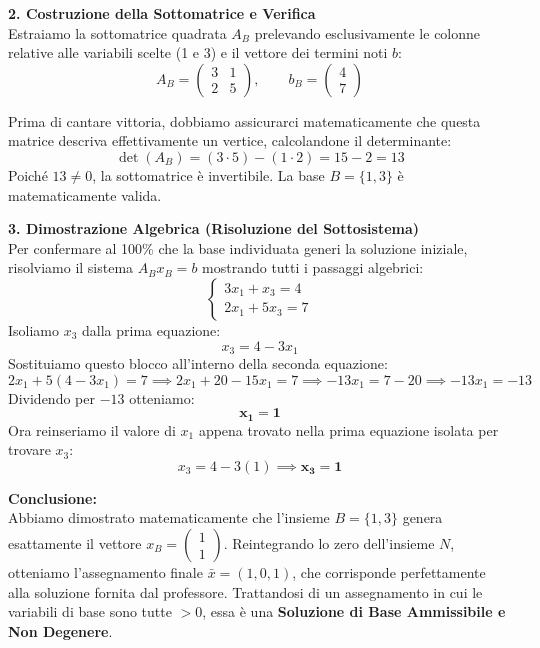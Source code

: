 \documentclass[12pt, a4paper]{article}
\begin{document}
	\vspace{0.4cm}
	\textbf{2. Costruzione della Sottomatrice e Verifica}\\
	Estraiamo la sottomatrice quadrata $A_B$ prelevando esclusivamente le colonne relative alle variabili scelte (1 e 3) e il vettore dei termini noti $b$:
	\[
	A_B = \begin{pmatrix} 3 & 1 \\ 2 & 5 \end{pmatrix}, \qquad b_B = \begin{pmatrix} 4 \\ 7 \end{pmatrix}
	\]
	
	Prima di cantare vittoria, dobbiamo assicurarci matematicamente che questa matrice descriva effettivamente un vertice, calcolandone il determinante:
	\[
	\det(A_B) = (3 \cdot 5) - (1 \cdot 2) = 15 - 2 = 13
	\]
	Poiché $13 \neq 0$, la sottomatrice è invertibile. La base $B = \{1, 3\}$ è matematicamente valida.
	
	\vspace{0.4cm}
	\textbf{3. Dimostrazione Algebrica (Risoluzione del Sottosistema)}\\
	Per confermare al 100\% che la base individuata generi la soluzione iniziale, risolviamo il sistema $A_B x_B = b$ mostrando tutti i passaggi algebrici:
	\[
	\begin{cases}
		3x_1 + x_3 = 4 \\
		2x_1 + 5x_3 = 7
	\end{cases}
	\]
	Isoliamo $x_3$ dalla prima equazione:
	\[
	x_3 = 4 - 3x_1
	\]
	Sostituiamo questo blocco all'interno della seconda equazione:
	\[
	2x_1 + 5(4 - 3x_1) = 7 \implies 2x_1 + 20 - 15x_1 = 7 \implies -13x_1 = 7 - 20 \implies -13x_1 = -13 
	\]
	Dividendo per $-13$ otteniamo:
	\[
	\mathbf{x_1 = 1}
	\]
	Ora reinseriamo il valore di $x_1$ appena trovato nella prima equazione isolata per trovare $x_3$:
	\[
	x_3 = 4 - 3(1) \implies \mathbf{x_3 = 1}
	\]
	
	\textbf{Conclusione:}\\
	Abbiamo dimostrato matematicamente che l'insieme $B = \{1, 3\}$ genera esattamente il vettore $x_B = \begin{pmatrix} 1 \\ 1 \end{pmatrix}$. 
	Reintegrando lo zero dell'insieme $N$, otteniamo l'assegnamento finale $\bar{x} = (1, 0, 1)$, che corrisponde perfettamente alla soluzione fornita dal professore. Trattandosi di un assegnamento in cui le variabili di base sono tutte $> 0$, essa è una \textbf{Soluzione di Base Ammissibile e Non Degenere}.
	
\end{document}

